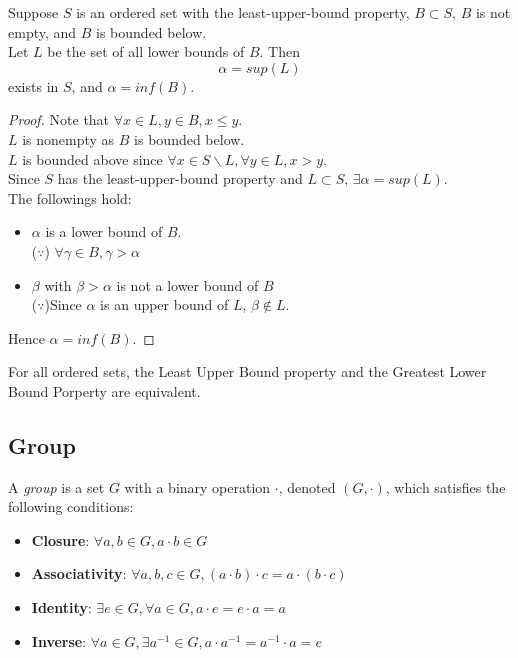 \documentclass{report}
\begin{document}
		\begin{thm} \label{thm_glb_lub_property}
			Suppose $S$ is an ordered set with the least-upper-bound property, $B \subset S$, $B$ is not empty, and $B$ is bounded below.\\
			Let $L$ be the set of all lower bounds of $B$. Then
			\begin{displaymath}
				\alpha=sup(L)
			\end{displaymath}
			exists in $S$, and $\alpha=inf(B)$.
		\end{thm}

		\begin{proof}
			Note that $\forall x \in L, y \in B, x \leq y$.\\
			$L$ is nonempty as $B$ is bounded below.\\
			$L$ is bounded above since $\forall x \in S \backslash L, \forall y \in L, x>y$.\\
			Since $S$ has the least-upper-bound property and $L \subset S$, $\exists \alpha=sup(L)$.\\
			The followings hold:
			\begin{itemize}
				\item $\alpha$ is a lower bound of $B$.
					\\($\because$) $\forall \gamma \in B, \gamma > \alpha$
				\item $\beta$ with $\beta > \alpha$ is not a lower bound of $B$
					\\($\because$)Since $\alpha$ is an upper bound of $L$, $\beta \notin L$.
			\end{itemize}
			Hence $\alpha=inf(B)$.
		\end{proof}
		
		\begin{coro} \label{coro_glb_lub_property_equiv}
			For all ordered sets, the Least Upper Bound property and the Greatest Lower Bound Porperty are equivalent.
		\end{coro}

		\subsection{Group}

			\begin{defn}[Group] \label{def_group}
				A \emph{group} is a set $G$ with a binary operation $\cdot$, denoted $(G,\cdot)$, which satisfies the following conditions:
				\begin{itemize}
					\item \textbf{Closure}: $\forall a,b \in G, a \cdot b \in G$
					\item \textbf{Associativity}: $\forall a,b,c \in G, (a \cdot b) \cdot c=a \cdot (b \cdot c)$
					\item \textbf{Identity}: $\exists e \in G, \forall a \in G, a \cdot e=e \cdot a=a$
					\item \textbf{Inverse}: $\forall a \in G, \exists a^{-1} \in G, a \cdot a^{-1}=a^{-1} \cdot a=e$
				\end{itemize}
			\end{defn}
\end{document}
